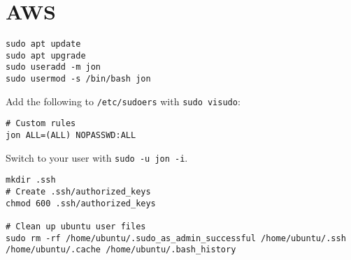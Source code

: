 \chapter{AWS}
\label{chap:aws}

\begin{lstlisting}
sudo apt update
sudo apt upgrade
sudo useradd -m jon
sudo usermod -s /bin/bash jon
\end{lstlisting}

Add the following to \texttt{/etc/sudoers} with \texttt{sudo visudo}:

\begin{lstlisting}
# Custom rules
jon ALL=(ALL) NOPASSWD:ALL
\end{lstlisting}

Switch to your user with \texttt{sudo -u jon -i}.

\begin{lstlisting}
mkdir .ssh
# Create .ssh/authorized_keys
chmod 600 .ssh/authorized_keys

# Clean up ubuntu user files
sudo rm -rf /home/ubuntu/.sudo_as_admin_successful /home/ubuntu/.ssh /home/ubuntu/.cache /home/ubuntu/.bash_history
\end{lstlisting}

